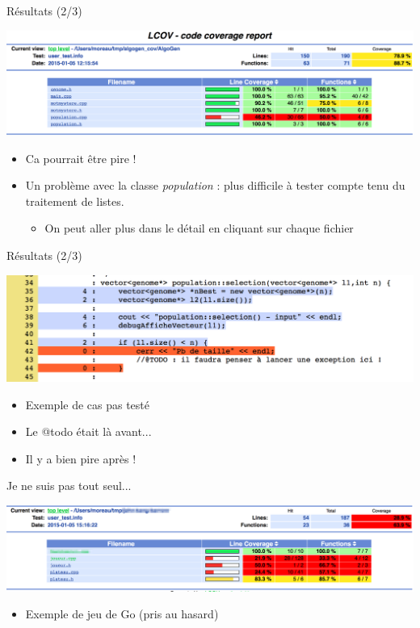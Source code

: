 \begin{frame}{Résultats (2/3)}
\begin{center}
\includegraphics[width=.9\textwidth]{fig/lcov_algogen.png}
\end{center}
\begin{itemize}
\item Ca pourrait être pire !
\item Un problème avec la classe \textit{population} : plus difficile à tester compte tenu du traitement de listes.
\begin{itemize}
\item On peut aller plus dans le détail en cliquant sur chaque fichier
\end{itemize}
\end{itemize}
\end{frame}

\begin{frame}{Résultats (2/3)}
\begin{center}
\includegraphics[width=.9\textwidth]{fig/lcov_untested.png}
\end{center}
\begin{itemize}
\item Exemple de cas pas testé
\item Le @todo était là avant...
\item Il y a bien pire après !
\end{itemize}
\end{frame}


\begin{frame}{Je ne suis pas tout seul...}
\begin{center}
\includegraphics[width=.9\textwidth]{fig/lcov_tp.png}
\end{center}
\begin{itemize}
\item Exemple de jeu de Go (pris au hasard)
\end{itemize}
\end{frame}


